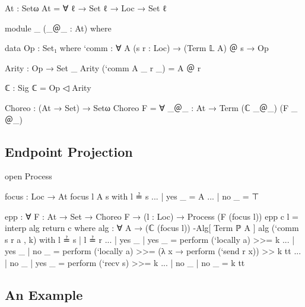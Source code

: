 \begin{code}
At : Setω
At = ∀ {ℓ} → Set ℓ → Loc → Set ℓ
\end{code}

\begin{code}
module _ (_＠_ : At) where

  data Op : Set₁ where
    `comm : ∀ {A} (s r : Loc) → (Term 𝕃 A) ＠ s → Op

  Arity : Op → Set _
  Arity (`comm {A} _ r _) = A ＠ r

  ℂ : Sig
  ℂ = Op ◁ Arity

Choreo : (At → Set) → Setω
Choreo F = ∀ {_＠_ : At} → Term (ℂ _＠_) (F _＠_)
\end{code}

\subsection{Endpoint Projection}

\begin{code}[hide]
open Process
\end{code}

\begin{code}
focus : Loc → At
focus l A s with l ≟ s
... | yes _ = A
... | no  _ = ⊤

epp : ∀ {F : At → Set} → Choreo F → (l : Loc) → Process (F (focus l))
epp c l = interp alg return c
  where
  alg : ∀ {A} → (ℂ (focus l)) -Alg[ Term ℙ A ]
  alg (`comm s r a , k) with l ≟ s | l ≟ r
  ... | yes _ | yes _ = perform (`locally a) >>= k
  ... | yes _ | no  _ = perform (`locally a) >>= (λ x → perform (`send r x)) >> k tt
  ... | no  _ | yes _ = perform (`recv s) >>= k
  ... | no  _ | no  _ = k tt
\end{code}

\subsection{An Example}
